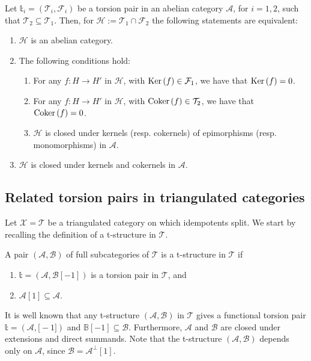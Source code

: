 \begin{thm}
  Let $\mathbb{t}_i=(\mathcal{T}_i,\mathcal{F}_i)$ be a torsion pair in an abelian category
  $\mathcal{A}$, for $i=1,2$, such that $\mathcal{T}_2\subseteq \mathcal{T}_1$. Then, for
  $\mathcal{H}:=\mathcal{T}_1\cap\mathcal{F}_2$ the following statements are equivalent:
  \begin{enumerate}[label=(\alph*)]
    \item $\mathcal{H}$ is an abelian category.
    \item The following conditions hold:
      \begin{enumerate}[label=(\alph{enumi}\arabic*)]
        \item For any $f:H\to H'$ in $\mathcal{H}$, with $\mathrm{\textup{Ker\,}}(f)\in\mathcal{F}_1$,
        we have that $\mathrm{\textup{Ker\,}}(f)=0$.
        \item For any $f:H\to H'$ in $\mathcal{H}$, with $\mathrm{\textup{Coker\,}}(f)\in\mathcal{T}_2$,
        we have that $\mathrm{\textup{Coker\,}}(f)=0$.
        \item $\mathcal{H}$ is closed under kernels (resp. cokernels) of epimorphisms
        (resp. monomorphisms) in $\mathcal{A}$.
      \end{enumerate}
    \item $\mathcal{H}$ is closed under kernels and cokernels in $\mathcal{A}$.
  \end{enumerate}
\end{thm}

\subsection{Related torsion pairs in triangulated categories}

Let $\mathcal{X}=\mathcal{T}$ be a triangulated category on which idempotents split.
We start by recalling the definition of a t-structure in $\mathcal{T}$.

\begin{definition}
  A pair $(\mathcal{A},\mathcal{B})$ of full subcategories of $\mathcal{T}$ is a t-structure
  in $\mathcal{T}$ if
  \begin{enumerate}[label=(\alph*)]
    \item $\mathbb{t}=(\mathcal{A},\mathcal{B}[-1])$ is a torsion pair in $\mathcal{T}$, and
    \item $\mathcal{A}[1]\subseteq \mathcal{A}$.
  \end{enumerate}
\end{definition}

\begin{rmk}
  It is well known that any t-structure $(\mathcal{A},\mathcal{B})$ in $\mathcal{T}$
  gives a functional torsion pair $\mathbb{t}=(\mathcal{A},\mathcal[-1])$ and
  $\mathbb{B}[-1]\subseteq\mathcal{B}$. Furthermore, $\mathcal{A}$ and
  $\mathcal{B}$ are closed under extensions and direct summands. Note that the t-structure
  $(\mathcal{A},\mathcal{B})$ depends only on $\mathcal{A}$, since $\mathcal{B}=\mathcal{A}^\perp[1]$.
\end{rmk}

